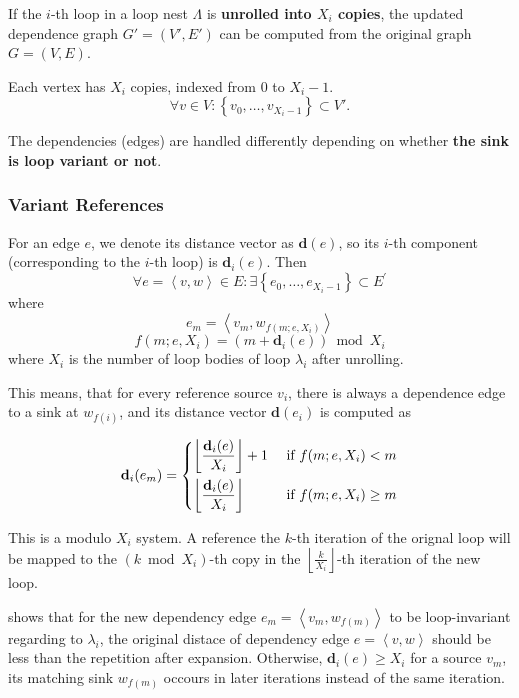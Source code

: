 If the $i$-th loop in a loop nest $\Lambda$ is \textbf{unrolled into $X_i$ copies}, the updated dependence graph
$G' = (V', E')$ can be computed from the original graph $G = (V,E)$.

Each vertex has $X_i$ copies, indexed from $0$ to $X_i-1$.
\[
\forall v \in V: \left\{v_{0}, \dots, v_{X_i-1}\right\} \subset V'.
\]

The dependencies (edges) are handled differently depending on whether
\textbf{the sink is loop variant or not}.

\subsubsection{Variant References}
For an edge $e$, we denote its distance vector as $\mathbf{d}(e)$, so its $i$-th
component (corresponding to the $i$-th loop) is $\mathbf{d}_{i}(e)$. Then
\[
  \forall e = \left\langle v, w \right\rangle \in E: \exists \left\{e_{0}, \dots,
  e_{X_i-1}\right\} \subset E^{\prime}
\]
where
\[
e_{m} = \left\langle v_{m}, w_{f(m;e,X_{i})} \right\rangle
\]
\begin{equation}
  f(m;e,X_{i}) = \left(m + \mathbf{d}_{i}(e)\right) \bmod X_{i}
\end{equation}
where $X_{i}$ is the number of loop bodies of loop $\lambda_{i}$ after
unrolling.

This means, that for every reference source $v_{i}$, there is always a
dependence edge to a sink at $w_{f(i)}$, and its distance vector
$\mathbf{d}(e_{i})$ is computed as

\begin{equation}
  \label{eq:ck94-unrolled-distance}
  \mathbf{d}_{i}(e_{m}) =
  \begin{dcases}
    \left\lfloor \frac{\mathbf{d}_{i}(e)}{X_{i}}\right\rfloor + 1
    &\text{ if } f(m; e, X_{i}) < m \\
    \left\lfloor \frac{\mathbf{d}_{i}(e)}{X_{i}}\right\rfloor
    &\text{ if } f(m; e, X_{i}) \ge m
  \end{dcases}
\end{equation}

This is a modulo $X_{i}$ system. A reference the $k$-th iteration of the
orignal loop will be mapped to the $(k \bmod X_{i})$-th copy in the
$\left\lfloor \frac{k}{X_{i}} \right\rfloor$-th iteration of the new loop.


 shows that for the new dependency edge
$e_{m}=\left\langle v_{m}, w_{f(m)} \right\rangle$
to be loop-invariant regarding to $\lambda_{i}$, the original distace of
dependency edge $e = \left\langle v, w \right\rangle$ should be less than the
repetition after expansion. Otherwise, $\mathbf{d}_{i}(e) \ge X_{i}$
for a source $v_{m}$, its matching sink
$w_{f(m)}$ occours in later iterations instead of the same iteration.

